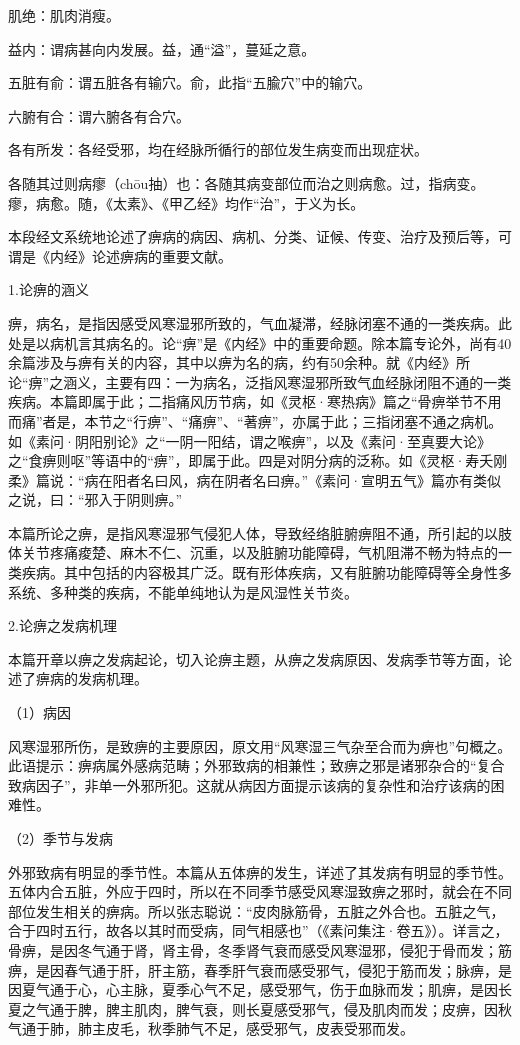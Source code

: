 \documentclass[draft,12pt]{ctexbook}
\begin{document}
\begin{jiaozhu}
	\item 肌绝：肌肉消瘦。
	\item 益内：谓病甚向内发展。益，通“溢”，蔓延之意。
	\item 五脏有俞：谓五脏各有输穴。俞，此指“五腧穴”中的输穴。
	\item 六腑有合：谓六腑各有合穴。
	\item 各有所发：各经受邪，均在经脉所循行的部位发生病变而出现症状。
	\item 各随其过则病瘳（chōu抽）也：各随其病变部位而治之则病愈。过，指病变。瘳，病愈。随，《太素》、《甲乙经》均作“治”，于义为长。
\end{jiaozhu}


本段经文系统地论述了痹病的病因、病机、分类、证候、传变、治疗及预后等，可谓是《内经》论述痹病的重要文献。

1.论痹的涵义

痹，病名，是指因感受风寒湿邪所致的，气血凝滞，经脉闭塞不通的一类疾病。此处是以病机言其病名的。论“痹”是《内经》中的重要命题。除本篇专论外，尚有40余篇涉及与痹有关的内容，其中以痹为名的病，约有50余种。就《内经》所论“痹”之涵义，主要有四：一为病名，泛指风寒湿邪所致气血经脉闭阻不通的一类疾病。本篇即属于此；二指痛风历节病，如《灵枢·寒热病》篇之“骨痹举节不用而痛”者是，本节之“行痹”、“痛痹”、“著痹”，亦属于此；三指闭塞不通之病机。如《素问·阴阳别论》之“一阴一阳结，谓之喉痹”，以及《素问·至真要大论》之“食痹则呕”等语中的“痹”，即属于此。四是对阴分病的泛称。如《灵枢·寿夭刚柔》篇说：“病在阳者名曰风，病在阴者名曰痹。”《素问·宣明五气》篇亦有类似之说，曰：“邪入于阴则痹。”

本篇所论之痹，是指风寒湿邪气侵犯人体，导致经络脏腑痹阻不通，所引起的以肢体关节疼痛痠楚、麻木不仁、沉重，以及脏腑功能障碍，气机阻滞不畅为特点的一类疾病。其中包括的内容极其广泛。既有形体疾病，又有脏腑功能障碍等全身性多系统、多种类的疾病，不能单纯地认为是风湿性关节炎。

2.论痹之发病机理

本篇开章以痹之发病起论，切入论痹主题，从痹之发病原因、发病季节等方面，论述了痹病的发病机理。

（1）病因

风寒湿邪所伤，是致痹的主要原因，原文用“风寒湿三气杂至合而为痹也”句概之。此语提示：痹病属外感病范畴；外邪致病的相兼性；致痹之邪是诸邪杂合的“复合致病因子”，非单一外邪所犯。这就从病因方面提示该病的复杂性和治疗该病的困难性。

（2）季节与发病

外邪致病有明显的季节性。本篇从五体痹的发生，详述了其发病有明显的季节性。五体内合五脏，外应于四时，所以在不同季节感受风寒湿致痹之邪时，就会在不同部位发生相关的痹病。所以张志聪说：“皮肉脉筋骨，五脏之外合也。五脏之气，合于四时五行，故各以其时而受病，同气相感也”（《素问集注·卷五》）。详言之，骨痹，是因冬气通于肾，肾主骨，冬季肾气衰而感受风寒湿邪，侵犯于骨而发；筋痹，是因春气通于肝，肝主筋，春季肝气衰而感受邪气，侵犯于筋而发；脉痹，是因夏气通于心，心主脉，夏季心气不足，感受邪气，伤于血脉而发；肌痹，是因长夏之气通于脾，脾主肌肉，脾气衰，则长夏感受邪气，侵及肌肉而发；皮痹，因秋气通于肺，肺主皮毛，秋季肺气不足，感受邪气，皮表受邪而发。
\end{document}
